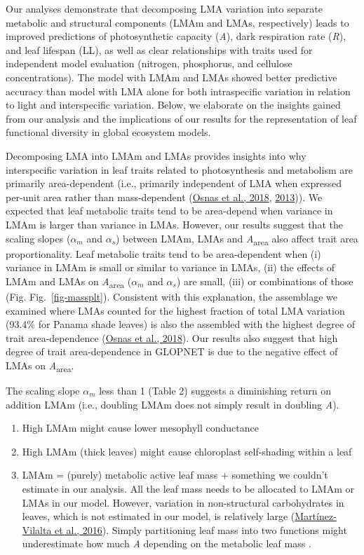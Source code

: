 \documentclass[
  12pt,
  a4paper,
,tablecaptionabove
]{scrartcl}
\providecommand{\tightlist}{%
  \setlength{\itemsep}{0pt}\setlength{\parskip}{0pt}}
\begin{document}
Our analyses demonstrate that decomposing LMA variation into separate
metabolic and structural components (LMAm and LMAs, respectively) leads
to improved predictions of photosynthetic capacity (\emph{A}), dark
respiration rate (\emph{R}), and leaf lifespan (LL), as well as clear
relationships with traits used for independent model evaluation
(nitrogen, phosphorus, and cellulose concentrations). The model with
LMAm and LMAs showed better predictive accuracy than model with LMA
alone for both intraspecific variation in relation to light and
interspecific variation. Below, we elaborate on the insights gained from
our analysis and the implications of our results for the representation
of leaf functional diversity in global ecosystem models.

Decomposing LMA into LMAm and LMAs provides insights into why
interspecific variation in leaf traits related to photosynthesis and
metabolism are primarily area-dependent (i.e., primarily independent of
LMA when expressed per-unit area rather than mass-dependent
(\protect\hyperlink{ref-Osnas2018}{Osnas et al., 2018},
\protect\hyperlink{ref-Osnas2013}{2013})). We expected that leaf
metabolic traits tend to be area-depend when variance in LMAm is larger
than variance in LMAs. However, our results suggest that the scaling
slopes (\(\alpha_m\) and \(\alpha_s\)) between LMAm, LMAs and
\emph{A}\textsubscript{area} also affect trait area proportionality.
Leaf metabolic traits tend to be area-dependent when (i) variance in
LMAm is small or similar to variance in LMAs, (ii) the effects of LMAm
and LMAs on \emph{A}\textsubscript{area} (\(\alpha_m\) and \(\alpha_s\))
are small, (iii) or combinations of those (Fig. Fig.~\ref{fig-massplt}).
Consistent with this explanation, the assemblage we examined where LMAs
counted for the highest fraction of total LMA variation (93.4\% for
Panama shade leaves) is also the assembled with the highest degree of
trait area-dependence (\protect\hyperlink{ref-Osnas2018}{Osnas et al.,
2018}). Our results also suggest that high degree of trait
area-dependence in GLOPNET is due to the negative effect of LMAs on
\emph{A}\textsubscript{area}.

The scaling slope \(\alpha_m\) less than 1 (Table 2) suggests a
diminishing return on addition LMAm (i.e., doubling LMAm does not simply
result in doubling \emph{A}).

\begin{enumerate}
\def\labelenumi{\arabic{enumi}.}
\tightlist
\item
  High LMAm might cause lower mesophyll conductance
\item
  High LMAm (thick leaves) might cause chloroplast self-shading within a
  leaf
\item
  LMAm = (purely) metabolic active leaf mass + something we couldn't
  estimate in our analysis. All the leaf mass needs to be allocated to
  LMAm or LMAs in our model. However, variation in non-structural
  carbohydrates in leaves, which is not estimated in our model, is
  relatively large
  (\protect\hyperlink{ref-Martinez-Vilalta2016}{Martínez-Vilalta et al.,
  2016}). Simply partitioning leaf mass into two functions might
  underestimate how much \emph{A} depending on the metabolic leaf mass .
\end{enumerate}
\end{document}
